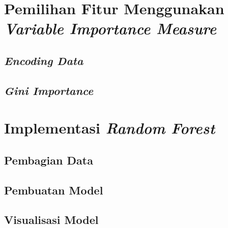 \documentclass[ugmtesis]{ugmtesis}
\begin{document}
	\section{Pemilihan Fitur Menggunakan \textit{Variable Importance Measure}}
	\label{implementasi pemilihan fitur menggunakan variable importance measure}
	

			\subsection{\textit{Encoding Data}}
			\label{implementasi encoding data}
			

			\subsection{\textit{Gini Importance}}
			\label{implementasi gini importance}
			

	\section{Implementasi \textit{Random Forest}}
	\label{implementasi random forest}
	

		\subsection{Pembagian Data}
		\label{implementasi pembagian data}
		

		\subsection{Pembuatan Model}
		\label{implementasi pembuatan model}
		

		\subsection{Visualisasi Model}
		\label{implementasi visualisasi model}
		

\end{document}
